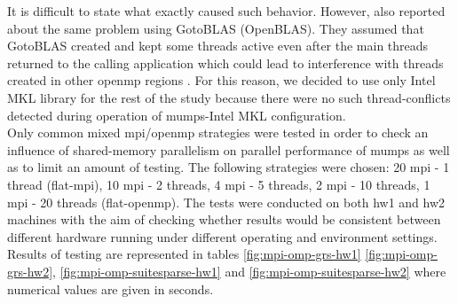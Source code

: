 It is difficult to state what exactly caused such behavior. However, \citeauthor{chowdhury2010some} also reported about the same problem using GotoBLAS (OpenBLAS). They assumed that GotoBLAS created and kept some threads active even after the main threads returned to the calling application which could lead to interference with threads created in other \acrshort{openmp} regions \cite{chowdhury2010some}. For this reason, we decided to use only Intel MKL library for the rest of the study because there were no such thread-conflicts detected during operation of \acrshort{mumps}-Intel MKL configuration.\\


Only common mixed \acrshort{mpi}/\acrshort{openmp} strategies were tested in order to check an influence of shared-memory parallelism on parallel performance of \acrshort{mumps} as well as to limit an amount of testing. The following strategies were chosen: 20 \acrshort{mpi} - 1 thread (flat-\acrshort{mpi}), 10 \acrshort{mpi} - 2 threads, 4 \acrshort{mpi} - 5 threads, 2 \acrshort{mpi} - 10 threads, 1 \acrshort{mpi} - 20 threads (flat-\acrshort{openmp}). The tests were conducted on both \gls{hw1} and \gls{hw2} machines with the aim of checking whether  results would be consistent between different hardware running under different operating and environment settings. Results of testing are represented in tables \ref{fig:mpi-omp-grs-hw1} \ref{fig:mpi-omp-grs-hw2}, \ref{fig:mpi-omp-suitesparse-hw1} and \ref{fig:mpi-omp-suitesparse-hw2} where numerical values are given in seconds.\\


